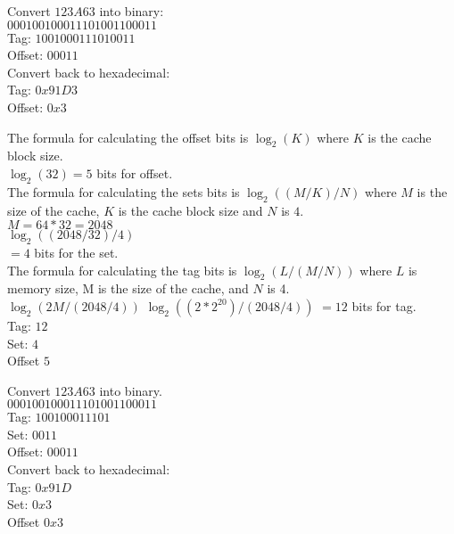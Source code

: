 \documentclass{article}
\begin{document}
 {
     Convert $123A63$ into binary: \\
     $0001 0010 0011 1010 0110 0011$ \\
     Tag: $1001000111010011$ \\
     Offset: $00011$ \\
     Convert back to hexadecimal: \\
     Tag: $0x91D3$ \\
     Offset: $0x3$ \\
}

 {
     The formula for calculating the offset bits is $\log_2(K)$ where $K$ is the cache block size. \\
     $\log_2(32) = 5$ bits for offset. \\
     The formula for calculating the sets bits is $\log_2((M/K) / N)$ where $M$ is the size of the cache, $K$ is the cache block size and $N$ is $4$. \\
     $M = 64 * 32 = 2048$ \\
     $\log_2((2048 / 32) / 4)$ \\
     $ = 4$ bits for the set. \\
     The formula for calculating the tag bits is $\log_2(L / (M / N))$ where $L$ is memory size, M is the size of the cache, and $N$ is 4. \\
     $\log_2(2M / (2048 / 4))$
     $\log_2((2 * 2^{20}) / (2048 / 4))$
     $ = 12$ bits for tag. \\
     Tag: $12$ \\
     Set: $4$ \\
     Offset $5$ \\
}    

 {
     Convert $123A63$ into binary. \\
     $0001 0010 0011 1010 0110 0011$ \\
     Tag: $100100011101$ \\
     Set: $0011$ \\
     Offset: $00011$ \\
     Convert back to hexadecimal: \\
     Tag: $0x91D$ \\
     Set: $0x3$ \\
     Offset $0x3$ \\
}
\end{document}
